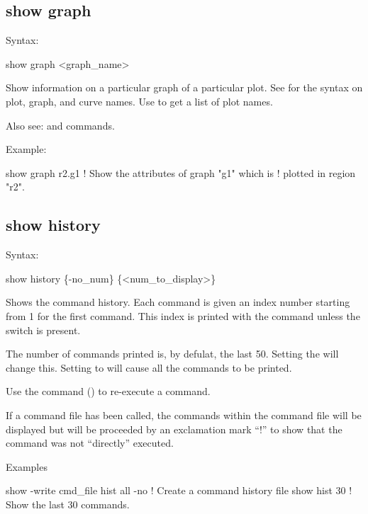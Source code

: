 {{{{{%

\subsection{show graph}
\label{s:show.graph}

Syntax:
\begin{example}
  show graph <graph_name>
\end{example}

Show information on a particular graph of a particular plot. See  for the
syntax on plot, graph, and curve names.  Use  to get a list of plot names.

Also see:  and  commands.

Example:
\begin{example}
  show graph r2.g1         ! Show the attributes of graph "g1" which is 
                           !   plotted in region "r2".
\end{example}


\subsection{show history}
\label{s:show.history}

Syntax:
\begin{example}
  show history \{-no_num\} \{<num_to_display>\}
\end{example}

Shows the command history. Each command is given an index number starting from 1 for
the first command. This index is printed with the command unless the  switch
is present.

The number of commands printed is, by defulat, the last 50. Setting the  will
change this. Setting  to   will cause all the commands to be printed.

Use the command  () to re-execute a command. 


If a command file has been called, the commands within the command file will be displayed
but will be proceeded by an exclamation mark ``!'' to show that the command was not ``directly'' executed.

Examples
\begin{example}
  show -write cmd_file hist all -no   ! Create a command history file
  show hist 30                        ! Show the last 30 commands.
\end{example}

}}}}}
